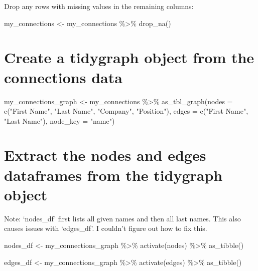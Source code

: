 \documentclass[
]{article}
\newenvironment{Shaded}{\begin{snugshade}}{\end{snugshade}}
\newcommand{\AttributeTok}[1]{\textcolor[rgb]{0.77,0.63,0.00}{#1}}
\newcommand{\FunctionTok}[1]{\textcolor[rgb]{0.00,0.00,0.00}{#1}}
\newcommand{\NormalTok}[1]{#1}
\newcommand{\OtherTok}[1]{\textcolor[rgb]{0.56,0.35,0.01}{#1}}
\newcommand{\SpecialCharTok}[1]{\textcolor[rgb]{0.00,0.00,0.00}{#1}}
\newcommand{\StringTok}[1]{\textcolor[rgb]{0.31,0.60,0.02}{#1}}
\begin{document}
Drop any rows with missing values in the remaining columns:

\begin{Shaded}
\begin{Highlighting}[]
\NormalTok{my\_connections }\OtherTok{\textless{}{-}}\NormalTok{ my\_connections }\SpecialCharTok{\%\textgreater{}\%} \FunctionTok{drop\_na}\NormalTok{()}
\end{Highlighting}
\end{Shaded}

\hypertarget{create-a-tidygraph-object-from-the-connections-data}{%
\section{Create a tidygraph object from the connections
data}\label{create-a-tidygraph-object-from-the-connections-data}}

\begin{Shaded}
\begin{Highlighting}[]
\NormalTok{my\_connections\_graph }\OtherTok{\textless{}{-}}\NormalTok{ my\_connections }\SpecialCharTok{\%\textgreater{}\%}
  \FunctionTok{as\_tbl\_graph}\NormalTok{(}\AttributeTok{nodes =} \FunctionTok{c}\NormalTok{(}\StringTok{"First Name"}\NormalTok{, }\StringTok{"Last Name"}\NormalTok{, }\StringTok{"Company"}\NormalTok{, }\StringTok{"Position"}\NormalTok{),}
               \AttributeTok{edges =} \FunctionTok{c}\NormalTok{(}\StringTok{"First Name"}\NormalTok{, }\StringTok{"Last Name"}\NormalTok{),}
               \AttributeTok{node\_key =} \StringTok{"name"}\NormalTok{)}
\end{Highlighting}
\end{Shaded}

\hypertarget{extract-the-nodes-and-edges-dataframes-from-the-tidygraph-object}{%
\section{Extract the nodes and edges dataframes from the tidygraph
object}\label{extract-the-nodes-and-edges-dataframes-from-the-tidygraph-object}}

Note: `nodes\_df' first lists all given names and then all last names.
This also causes issues with `edges\_df'. I couldn't figure out how to
fix this.

\begin{Shaded}
\begin{Highlighting}[]
\NormalTok{nodes\_df }\OtherTok{\textless{}{-}}\NormalTok{ my\_connections\_graph }\SpecialCharTok{\%\textgreater{}\%}
  \FunctionTok{activate}\NormalTok{(nodes) }\SpecialCharTok{\%\textgreater{}\%}
  \FunctionTok{as\_tibble}\NormalTok{()}

\NormalTok{edges\_df }\OtherTok{\textless{}{-}}\NormalTok{ my\_connections\_graph }\SpecialCharTok{\%\textgreater{}\%}
  \FunctionTok{activate}\NormalTok{(edges) }\SpecialCharTok{\%\textgreater{}\%}
  \FunctionTok{as\_tibble}\NormalTok{()}
\end{Highlighting}
\end{Shaded}
\end{document}

